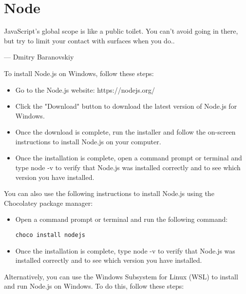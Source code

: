 {\justifying
	\chapter{Node} \label{chap:node}
	\epigraph{JavaScript’s global scope is like a public toilet. You can’t avoid going in there, but try to limit your contact with surfaces when you do..}{--- \textup{Dmitry Baranovskiy}}

To install Node.js on Windows, follow these steps:

\begin{itemize}
\item Go to the Node.js website: https://nodejs.org/
\item Click the "Download" button to download the latest version of Node.js for Windows.
\item Once the download is complete, run the installer and follow the on-screen instructions to install Node.js on your computer.
\item Once the installation is complete, open a command prompt or terminal and type node -v to verify that Node.js was installed correctly and to see which version you have installed.
\end{itemize}

You can also use the following instructions to install Node.js using the Chocolatey package manager:

\begin{itemize}
\item Open a command prompt or terminal and run the following command:

\begin{verbatim}
choco install nodejs
\end{verbatim}
\item Once the installation is complete, type node -v to verify that Node.js was installed correctly and to see which version you have installed.
\end{itemize}

Alternatively, you can use the Windows Subsystem for Linux (WSL) to install and run Node.js on Windows. To do this, follow these steps:

}
